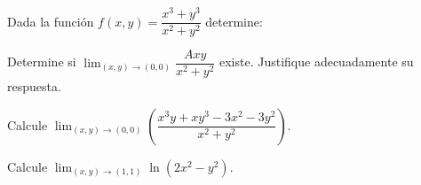 \begin{prob}
Dada la función $f(x,y)=\dfrac{x^3+y^3}{x^2+y^2}$ determine:
\end{prob}

\begin{prob}
Determine si $\displaystyle\lim_{(x,y)\to (0,0)} \dfrac{Axy}{x^2+y^2}$ existe. Justifique adecuadamente su respuesta.
\end{prob}

\begin{prob}
Calcule $\displaystyle\lim_{(x,y)\to (0,0)}\left(\dfrac{x^3y+xy^3-3x^2-3y^2}{x^2+y^2}\right).$
\end{prob}

\begin{prob}
Calcule $\displaystyle\lim_{(x,y)\to (1,1)}\ln\left(2x^2-y^2\right).$
\end{prob}


